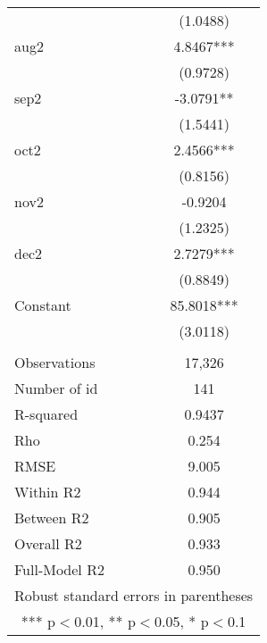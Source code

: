 \documentclass[]{article}
\begin{document}
\begin{tabular}{lc}
 & (1.0488) \\
aug2 & 4.8467*** \\
 & (0.9728) \\
sep2 & -3.0791** \\
 & (1.5441) \\
oct2 & 2.4566*** \\
 & (0.8156) \\
nov2 & -0.9204 \\
 & (1.2325) \\
dec2 & 2.7279*** \\
 & (0.8849) \\
Constant & 85.8018*** \\
 & (3.0118) \\
 &  \\
Observations & 17,326 \\
Number of id & 141 \\
R-squared & 0.9437 \\
Rho & 0.254 \\
RMSE & 9.005 \\
Within R2 & 0.944 \\
Between R2 & 0.905 \\
Overall R2 & 0.933 \\
 Full-Model R2 & 0.950 \\ \hline
\multicolumn{2}{c}{ Robust standard errors in parentheses} \\
\multicolumn{2}{c}{ *** p$<$0.01, ** p$<$0.05, * p$<$0.1} \\
\end{tabular}
\end{document}
